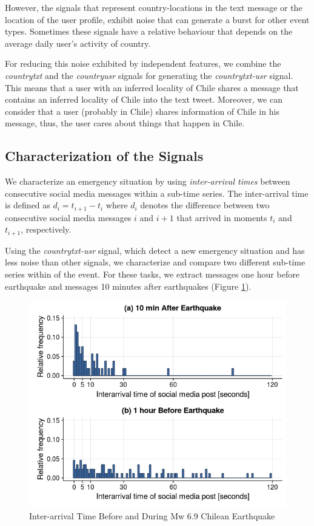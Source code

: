 \documentclass{ewic}
\begin{document}
However, the signals that represent country-locations in the text message or the location of the user profile, exhibit noise that can generate a burst for other event types. Sometimes these signals have a relative behaviour that depends on the average daily user's activity of country. 

For reducing this noise exhibited by independent features, we combine the \textit{countrytxt} and the \textit{countryusr} signals for generating the \textit{countrytxt-usr} signal. This means that a user with an inferred locality of Chile shares a message that contains an inferred locality of Chile into the text tweet. Moreover, we can consider that a user (probably in Chile) shares information of Chile in his message, thus, the user cares about things that happen in Chile.

\subsection{Characterization of the Signals}

We characterize an emergency situation by using \textit{inter-arrival times} between consecutive social media messages within a sub-time series. The inter-arrival time is defined as $d_{i} = t_{i+1} - t_{i}$ where $d_{i}$ denotes the difference between two consecutive social media messages $i$ and $i+1$ that arrived in moments $t_{i}$ and $t_{i+1}$, respectively.

Using the \textit{countrytxt-usr} signal, which detect a new emergency situation and has less noise than other signals, we characterize and compare two different sub-time series within of the event. For these tasks, we extract messages one hour before earthquake and messages 10 minutes after earthquakes (Figure \ref{interarrival}). 
\begin{figure}[h]
	\centering
	\includegraphics[width=\columnwidth]{img/interarrival.png}
	\caption{Inter-arrival Time Before and During Mw 6.9 Chilean Earthquake}
	\label{interarrival}
\end{figure}
\end{document}
